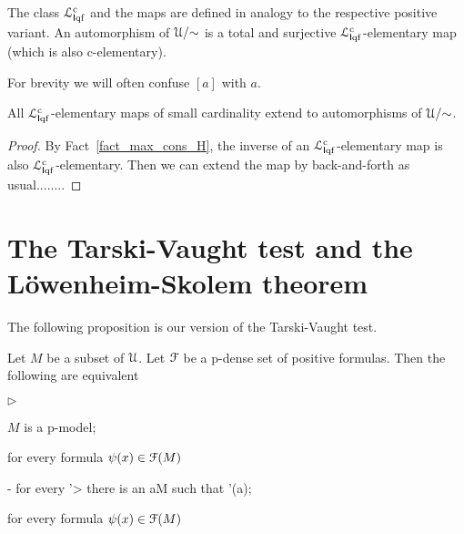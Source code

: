 \documentclass[10pt,oneside]{amsproc}
\newcommand{\mylabel}[1]{{#1}\hfill}
\renewenvironment{itemize}
  {\begin{list}{$\triangleright$}{%
  \setlength{\parskip}{0mm}
  \setlength{\topsep}{.4\baselineskip}
  \setlength{\rightmargin}{0mm}
  \setlength{\listparindent}{0mm}
  \setlength{\itemindent}{0mm}
  \setlength{\labelwidth}{3ex}
  \setlength{\itemsep}{.2\baselineskip}
  \setlength{\parsep}{.2\baselineskip}
  \setlength{\partopsep}{0mm}
  \setlength{\labelsep}{1ex}
  \setlength{\leftmargin}{\labelwidth+\labelsep}
  \let\makelabel\mylabel}}{%
\end{list}}
\renewcommand*{\emph}[1]{%
   \smash{\tikz[baseline]\node[rectangle, fill=teal!25, rounded corners, inner xsep=0.5ex, inner ysep=0.2ex, anchor=base, minimum height = 2.7ex]{\strut #1};}}
\def\existsH{\exists}
\begin{document}
{The class ${\EuScript L}^{\rm c}_{{\sf I}{\rm qf}}$ and the \emph{${\EuScript L}^{\rm c}_{{\sf I}{\rm qf}}$-elementary\/} maps are defined in analogy to the respective positive variant.
An automorphism of ${\EuScript U}/{\sim}$ is a total and surjective  ${\EuScript L}^{\rm c}_{{\sf I}{\rm qf}}$-elementary map (which is also c-elementary).

For brevity we will often confuse $[a]$ with $a$.

\begin{proposition}
  All ${\EuScript L}^{\rm c}_{{\sf I}{\rm qf}}$-elementary maps of small cardinality extend to automorphisms of ${\EuScript U}/{\sim}$.
\end{proposition}

\begin{proof}
  By Fact~\ref{fact_max_cons_H}, the inverse of an ${\EuScript L}^{\rm c}_{{\sf I}{\rm qf}}$-elementary map is also ${\EuScript L}^{\rm c}_{{\sf I}{\rm qf}}$-elementary.
  Then we can extend the map by back-and-forth as usual........
\end{proof}



 
\section{The Tarski-Vaught test and the L\"owenheim-Skolem theorem}

The following proposition is our version of the Tarski-Vaught test.

\begin{proposition}\label{prop_Tarski_Vaught}
  Let $M$ be a subset of ${\EuScript U}$.
  Let ${\EuScript F}$ be a p-dense set of positive formulas.
  Then the following are equivalent
  \begin{itemize}
    \item[1.] $M$ is a p-model;
    \item[2.] for every formula $\psi(x)\in{\EuScript F}(M)$
    
    \noindent\kern-\leftmargin
    \ceq{\hfill\existsH x\,\psi(x)}{\Rightarrow}
    {\textrm{ for every }\psi'>\psi\textrm{ there is an }a\in M\textrm{ such that }\psi'(a);}
  
    \item[3.] for every formula $\psi(x)\in{\EuScript F}(M)$
    

\end{itemize}
\end{proposition}}
\end{document}
